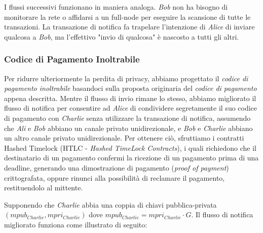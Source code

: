 I flussi successivi funzionano in maniera analoga.
\emph{Bob} non ha bisogno di monitorare la rete o affidarsi a un full-node per eseguire la scansione di tutte le transazioni. La transazione di notifica fa trapelare l'intenzione di \emph{Alice} di inviare qualcosa a \emph{Bob}, ma l'effettivo "invio di qualcosa" è nascosto a tutti gli altri.

\subsubsection{Codice di Pagamento Inoltrabile}
Per ridurre ulteriormente la perdita di privacy, abbiamo progettato il \emph{codice di pagamento inoltrabile} basandoci sulla proposta originaria del \emph{codice di pagamento} appena descritta. Mentre il flusso di invio rimane lo stesso, abbiamo migliorato il flusso di notifica per consentire ad \emph{Alice} di condividere segretamente il suo codice di pagamento con \emph{Charlie} senza utilizzare la transazione di notifica, assumendo che \emph{Ali} e \emph{Bob} abbiano un canale privato unidirezionale, e \emph{Bob} e \emph{Charlie} abbiano un altro canale privato unidirezionale. Per ottenere ciò, sfruttiamo i contratti Hashed Timelock (HTLC - \emph{Hashed TimeLock Contracts}), i quali richiedono che il destinatario di un pagamento confermi la ricezione di un pagamento prima di una deadline, generando una dimostrazione di pagamento (\emph{proof of payment}) crittografata, oppure rinunci alla possibilità di reclamare il pagamento, restituendolo al mittente.


Supponendo che \emph{Charlie} abbia una coppia di chiavi pubblica-privata $(mpub_{Charlie}, mpri_{Charlie})$ dove $mpub_{Charlie} = mpri_{Charlie}\cdot G$. Il flusso di notifica migliorato funziona come illustrato di seguito:

